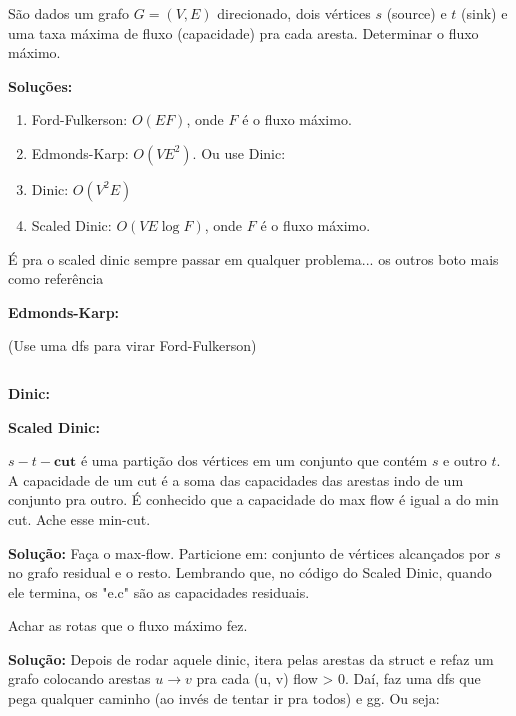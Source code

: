  São dados um grafo $G=(V, E)$ direcionado, dois vértices $s$ (source) e $t$ (sink) e uma taxa máxima de fluxo (capacidade) pra cada aresta. Determinar o fluxo máximo.

\textbf{Soluções:}
\begin{enumerate}
    \item Ford-Fulkerson: $O(EF)$, onde $F$ é o fluxo máximo.
    \item Edmonds-Karp: $O(V E^2)$. Ou use Dinic:
    \item Dinic: $O(V^2 E)$
    \item Scaled Dinic: $O(VE \log F)$, onde $F$ é o fluxo máximo.
\end{enumerate}

É pra o scaled dinic sempre passar  em qualquer problema... os outros boto mais
como referência

\textbf{Edmonds-Karp:}

(Use uma dfs para virar Ford-Fulkerson)

\begin{lstlisting}[language=C++, breaklines=true]

\end{lstlisting}


\textbf{Dinic:}


\textbf{Scaled Dinic:}


 $s-t-\textbf{cut}$ é uma partição dos vértices em um conjunto que contém $s$ e outro $t$.
A capacidade de um cut é a soma das capacidades das arestas indo de um conjunto pra outro.
É conhecido que a capacidade do max flow é igual a do min cut. Ache esse min-cut.

\textbf{Solução:} Faça o max-flow. Particione em: conjunto de vértices alcançados por $s$ no grafo residual e o resto.
Lembrando que, no código do Scaled Dinic, quando ele termina, os "e.c" são as capacidades residuais.

 Achar as rotas que o fluxo máximo fez.

\textbf{Solução:} Depois de rodar aquele dinic, itera pelas arestas da struct e refaz um grafo
colocando arestas $u \to v$ pra cada (u, v) flow > 0. Daí, faz uma dfs que pega qualquer caminho
(ao invés de tentar ir pra todos) e gg. Ou seja:


